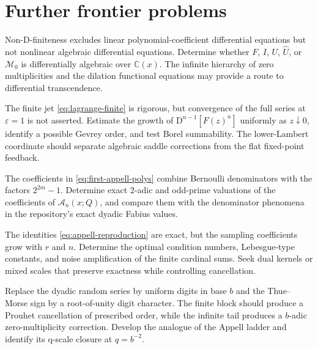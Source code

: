 \documentclass[11pt,oneside]{article}
\theoremstyle{definition}
\theoremstyle{remark}
\newcommand{\C}{\mathbb C}
\newcommand{\D}{\mathrm D}
\newcommand{\Acard}{\mathcal A}
\newcommand{\M}{\mathcal M}
\begin{document}
\section{Further frontier problems}
\label{sec:open}

\begin{frontieropenbox}[title=1. Differential transcendence]
Non-D-finiteness excludes linear polynomial-coefficient differential equations but not nonlinear algebraic differential equations.  Determine whether $F$, $I$, $U$, $\widehat U$, or $\M_0$ is differentially algebraic over $\C(x)$.  The infinite hierarchy of zero multiplicities and the dilation functional equations may provide a route to differential transcendence.
\end{frontieropenbox}

\begin{frontieropenbox}[title=2. Convergence and resurgence of the inverse Lagrange--Bell coupling series]
The finite jet \eqref{eq:lagrange-finite} is rigorous, but convergence of the full series at $\varepsilon=1$ is not asserted.  Estimate the growth of
$\D^{n-1}[F(z)^n]$ uniformly as $z\downarrow0$, identify a possible Gevrey order, and test Borel summability.  The lower-Lambert coordinate should separate algebraic saddle corrections from the flat fixed-point feedback.
\end{frontieropenbox}

\begin{frontieropenbox}[title=3. Exact two-adic denominator laws for the cardinal Appell family]
The coefficients in \eqref{eq:first-appell-polys} combine Bernoulli denominators with the factors $2^{2m}-1$.  Determine exact $2$-adic and odd-prime valuations of the coefficients of $\Acard_n(x;Q)$, and compare them with the denominator phenomena in the repository's exact dyadic Fabius values.
\end{frontieropenbox}

\begin{frontieropenbox}[title=4. Stability of coarsening reproduction]
The identities \eqref{eq:appell-reproduction} are exact, but the sampling coefficients grow with $r$ and $n$.  Determine the optimal condition numbers, Lebesgue-type constants, and noise amplification of the finite cardinal sums.  Seek dual kernels or mixed scales that preserve exactness while controlling cancellation.
\end{frontieropenbox}

\begin{frontieropenbox}[title=5. Base-$b$ Prouhet kernels]
Replace the dyadic random series by uniform digits in base $b$ and the Thue--Morse sign by a root-of-unity digit character.  The finite block should produce a Prouhet cancellation of prescribed order, while the infinite tail produces a $b$-adic zero-multiplicity correction.  Develop the analogue of the Appell ladder and identify its q-scale closure at $q=b^{-2}$.
\end{frontieropenbox}
\end{document}
